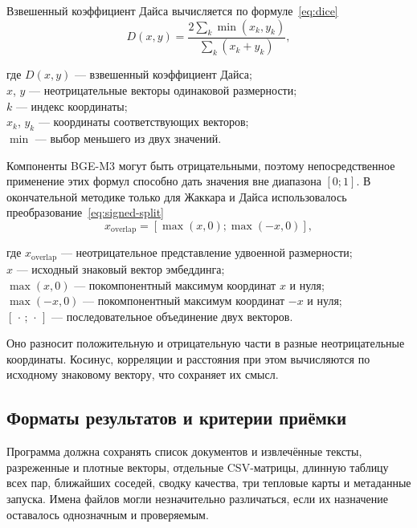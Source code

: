 \documentclass[a4paper,12pt]{extreport}
\begin{document}
Взвешенный коэффициент Дайса вычисляется по формуле~\eqref{eq:dice}
\begin{equation}
D(x,y)=\frac{2\sum_k\min(x_k,y_k)}{\sum_k(x_k+y_k)}, \label{eq:dice}
\end{equation}

где $D(x,y)$ --- взвешенный коэффициент Дайса;\\
\phantom{где }$x$, $y$ --- неотрицательные векторы одинаковой размерности;\\
\phantom{где }$k$ --- индекс координаты;\\
\phantom{где }$x_k$, $y_k$ --- координаты соответствующих векторов;\\
\phantom{где }$\min$ --- выбор меньшего из двух значений.

Компоненты BGE-M3 могут быть отрицательными, поэтому непосредственное применение этих формул способно дать значения вне диапазона $[0;1]$. В окончательной методике только для Жаккара и Дайса использовалось преобразование~\eqref{eq:signed-split}
\begin{equation}
\label{eq:signed-split}
x_{\mathrm{overlap}}=[\max(x,0);\max(-x,0)],
\end{equation}

где $x_{\mathrm{overlap}}$ --- неотрицательное представление удвоенной размерности;\\
\phantom{где }$x$ --- исходный знаковый вектор эмбеддинга;\\
\phantom{где }$\max(x,0)$ --- покомпонентный максимум координат $x$ и нуля;\\
\phantom{где }$\max(-x,0)$ --- покомпонентный максимум координат $-x$ и нуля;\\
\phantom{где }$[\,\cdot\,;\,\cdot\,]$ --- последовательное объединение двух векторов.

Оно разносит положительную и отрицательную части в разные неотрицательные координаты. Косинус, корреляции и расстояния при этом вычисляются по исходному знаковому вектору, что сохраняет их смысл.

\subsection{Форматы результатов и критерии приёмки}

Программа должна сохранять список документов и извлечённые тексты, разреженные и плотные векторы, отдельные CSV-матрицы, длинную таблицу всех пар, ближайших соседей, сводку качества, три тепловые карты и метаданные запуска. Имена файлов могли незначительно различаться, если их назначение оставалось однозначным и проверяемым.
\end{document}
